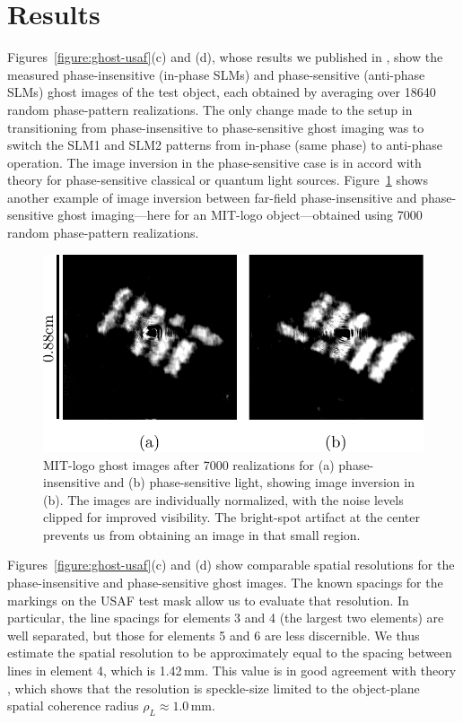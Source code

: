 \section{Results}

Figures~\ref{figure:ghost-usaf}(c) and (d), whose results we published in \cite{venkatraman-classical}, show the measured phase-insensitive (in-phase SLMs) and phase-sensitive (anti-phase SLMs) ghost images of the test object, each obtained by averaging over 18640 random phase-pattern realizations. The only change made to the setup in transitioning from phase-insensitive to phase-sensitive ghost imaging was to switch the SLM1 and SLM2 patterns from in-phase (same phase) to anti-phase operation. The image inversion in the phase-sensitive case is in accord with theory \cite{erkmen-unified,erkmen-from} for phase-sensitive classical or quantum light sources.  Figure~\ref{figure:ghost-mitlogo} shows another example of image inversion between far-field phase-insensitive and phase-sensitive ghost imaging---here for an MIT-logo object---obtained using 7000 random phase-pattern realizations.

\begin{figure}[htb]
\centerline{\includegraphics[width=12cm]{figure-ghost-mitlogo.pdf}}
\caption{MIT-logo ghost images after 7000 realizations for (a) 
phase-insensitive and (b) phase-sensitive light, showing image inversion in (b). The images are individually normalized, with the noise levels clipped for improved visibility. The bright-spot artifact at the center prevents us from obtaining an image in that small region.}
\label{figure:ghost-mitlogo}
\end{figure}

Figures~\ref{figure:ghost-usaf}(c) and (d) show comparable spatial resolutions for the phase-insensitive and phase-sensitive ghost images. The known spacings for the markings on the USAF test mask allow us to evaluate that resolution. In particular, the line spacings for elements 3 and 4 (the largest two elements) are well separated, but those for elements 5 and 6 are less discernible. We thus estimate the spatial resolution to be approximately equal to the spacing between lines in element 4, which is 1.42\,mm. This value is in good agreement with theory \cite{erkmen-unified}, which shows that the resolution is speckle-size limited to the object-plane spatial coherence radius $\rho_L \approx 1.0$\,mm.


